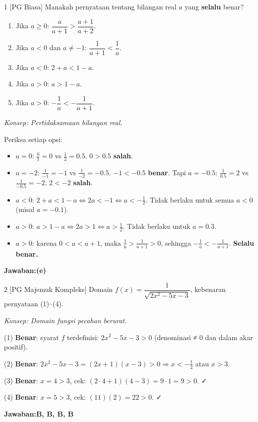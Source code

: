 \documentclass[11pt]{article}
\newcommand{\jawaban}[1]{\textbf{Jawaban:}\enspace\colorbox{gold!30}{\textbf{#1}}}
\newcommand{\konsep}[1]{\textit{Konsep: #1.}}
\newenvironment{pil}{%
  \begin{enumerate}[label=(\alph*),leftmargin=*,itemsep=1pt,topsep=3pt]}%
  {\end{enumerate}}
\begin{document}
\clearpage


\begin{soal}{1 \normalfont\small[PG Biasa]}
Manakah pernyataan tentang bilangan real $a$ yang \textbf{selalu} benar?
\begin{pil}
  \item Jika $a\geq0$: $\dfrac{a}{a+1}>\dfrac{a+1}{a+2}$.
  \item Jika $a<0$ dan $a\neq-1$: $\dfrac{1}{a+1}<\dfrac{1}{a}$.
  \item Jika $a<0$: $2+a<1-a$.
  \item Jika $a>0$: $a>1-a$.
  \item Jika $a>0$: $-\dfrac{1}{a}<-\dfrac{1}{a+1}$.
\end{pil}
\end{soal}
\begin{pembox}
\konsep{Pertidaksamaan bilangan real}

Periksa setiap opsi:
\begin{itemize}[leftmargin=*,itemsep=2pt]
\item[(a)] $a=0$: $\tfrac{0}{1}=0$ vs $\tfrac{1}{2}=0.5$. $0>0.5$ \textbf{salah}.
\item[(b)] $a=-2$: $\tfrac{1}{-1}=-1$ vs $\tfrac{1}{-2}=-0.5$. $-1<-0.5$ \textbf{benar}. Tapi $a=-0.5$: $\tfrac{1}{0.5}=2$ vs $\tfrac{1}{-0.5}=-2$. $2<-2$ \textbf{salah}.
\item[(c)] $a<0$: $2+a<1-a\Leftrightarrow 2a<-1\Leftrightarrow a<-\tfrac12$. Tidak berlaku untuk semua $a<0$ (misal $a=-0.1$).
\item[(d)] $a>0$: $a>1-a\Leftrightarrow 2a>1\Leftrightarrow a>\tfrac12$. Tidak berlaku untuk $a=0.3$.
\item[(e)] $a>0$: karena $0<a<a+1$, maka $\tfrac{1}{a}>\tfrac{1}{a+1}>0$, sehingga $-\tfrac{1}{a}<-\tfrac{1}{a+1}$. \textbf{Selalu benar.}
\end{itemize}

\jawaban{(e)}
\end{pembox}

\begin{soal}{2 \normalfont\small[PG Majemuk Kompleks]}
Domain $f(x)=\dfrac{1}{\sqrt{2x^2-5x-3}}$, kebenaran pernyataan (1)--(4).
\end{soal}
\begin{pembox}
\konsep{Domain fungsi pecahan berurat}

(1) \textbf{Benar}: syarat $f$ terdefinisi: $2x^2-5x-3>0$ (denominasi ≠ 0 dan dalam akar positif).

(2) \textbf{Benar}: $2x^2-5x-3=(2x+1)(x-3)>0\Rightarrow x<-\tfrac12$ atau $x>3$.

(3) \textbf{Benar}: $x=4>3$, cek: $(2\cdot4+1)(4-3)=9\cdot1=9>0$. ✓

(4) \textbf{Benar}: $x=5>3$, cek: $(11)(2)=22>0$. ✓

\jawaban{B, B, B, B}
\end{pembox}
\end{document}

